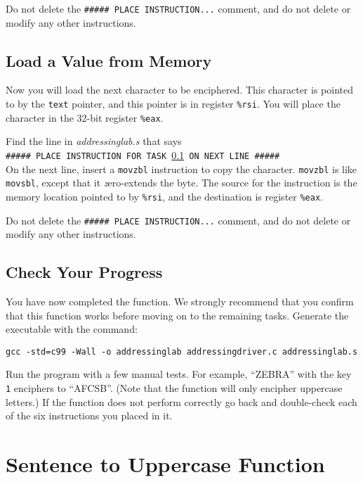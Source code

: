 
Do not delete the \texttt{\#\#\#\#\# PLACE INSTRUCTION...} comment, and do not
delete or modify any other instructions.

\subsection{Load a Value from Memory}\label{task5}

Now you will load the next character to be enciphered. This character is
pointed to by the \lstinline{text} pointer, and this pointer is in register
\lstinline{%rsi}. You will place the character in the 32-bit register
\lstinline{%eax}.

Find the line in \textit{addressinglab.s} that says \\
\texttt{\#\#\#\#\# PLACE INSTRUCTION FOR TASK \ref{task5} ON NEXT LINE \#\#\#\#\#} \\
On the next line, insert a \lstinline{movzbl} instruction to copy the
character. \lstinline{movzbl} is like \lstinline{movsbl}, except that it
\textit{z}ero-extends the byte. The source for the instruction is the memory
location pointed to by \lstinline{%rsi}, and the destination is register
\lstinline{%eax}.


Do not delete the \texttt{\#\#\#\#\# PLACE INSTRUCTION...} comment, and do not
delete or modify any other instructions.

\subsection*{Check Your Progress}

You have now completed the  function. We strongly
recommend that you confirm that this function works before moving on to the
remaining tasks. Generate the executable with the command:

\texttt{gcc -std=c99 -Wall -o addressinglab addressingdriver.c addressinglab.s}

Run the program with a few manual tests. For example, ``ZEBRA'' with the key
\texttt{1} enciphers to ``AFCSB''. (Note that the 
function will only encipher uppercase letters.) If the function does not
perform correctly go back and double-check each of the six instructions you
placed in it.


\section{Sentence to Uppercase Function}

